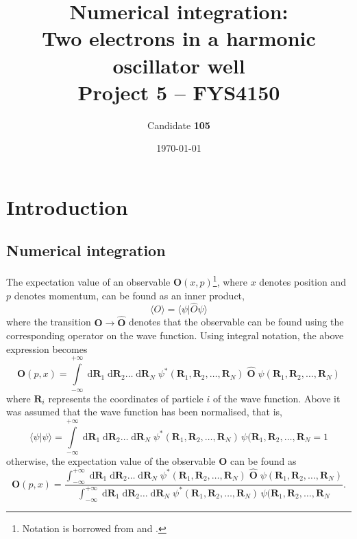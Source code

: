 \documentclass[a4paper,11pt]{article}
\date{\today}
\title{Numerical integration:\\ Two electrons in a harmonic oscillator well\\ \small{Project 5 -- FYS4150}}
\author{Candidate \textbf{105}}
\newcommand{\diff}{\ensuremath{\; \text{d}}}
\begin{document}
\onecolumn
\maketitle{}

\begin{abstract}
\end{abstract}

\section{Introduction}

\subsection{Numerical integration}
The expectation value of an observable $\mathbf{O}(x,p)$\footnote{Notation is borrowed from \cite{Griffiths:2005} and \cite{MHJ:2013}.}, where $x$ denotes position and $p$ denotes momentum, can be found as an inner product,
\begin{equation}
    \langle O \rangle   =   \langle \psi | \hat{O} \psi \rangle
    \label{eq:observable}
\end{equation}
where the transition $\mathbf{O} \to \hat{\mathbf{O}}$ denotes that the observable can be found using the corresponding operator on the wave function. Using integral notation, the above expression becomes
\begin{equation}
    \mathbf{O}(p,x)   =   \int\limits_{-\infty}^{+\infty} \diff \mathbf{R}_1 \diff \mathbf{R}_2 \dots \diff \mathbf{R}_N \; \psi^*(\mathbf{R}_1, \mathbf{R}_2, \dots, \mathbf{R}_N ) \; \hat{\mathbf{O}} \; \psi(\mathbf{R}_1, \mathbf{R}_2, \dots, \mathbf{R}_N )
    \label{eq:observable_int1}
\end{equation}
where $\mathbf{R}_i$ represents the coordinates of particle $i$ of the wave function. Above it was assumed that the wave function has been normalised, that is,
\[ \langle \psi | \psi \rangle = \int\limits_{-\infty}^{+\infty}\! \diff \mathbf{R}_1 \diff \mathbf{R}_2 \dots \diff \mathbf{R}_N \; \psi^*(\mathbf{R}_1, \mathbf{R}_2, \dots, \mathbf{R}_N ) \, \psi(\mathbf{R}_1, \mathbf{R}_2, \dots, \mathbf{R}_N = 1 \]
otherwise, the expectation value of the observable $\mathbf{O}$ can be found as
\begin{equation}
    \mathbf{O}(p,x)   =   \frac{\int_{-\infty}^{+\infty} \diff \mathbf{R}_1 \diff \mathbf{R}_2 \dots \diff \mathbf{R}_N \; \psi^*(\mathbf{R}_1, \mathbf{R}_2, \dots, \mathbf{R}_N ) \; \hat{\mathbf{O}} \; \psi(\mathbf{R}_1, \mathbf{R}_2, \dots, \mathbf{R}_N ) }{ \int_{-\infty}^{+\infty} \diff \mathbf{R}_1 \diff \mathbf{R}_2 \dots \diff \mathbf{R}_N \; \psi^*(\mathbf{R}_1, \mathbf{R}_2, \dots, \mathbf{R}_N ) \, \psi(\mathbf{R}_1, \mathbf{R}_2, \dots, \mathbf{R}_N }.
    \label{eq:observable_final}
\end{equation}
\end{document}
